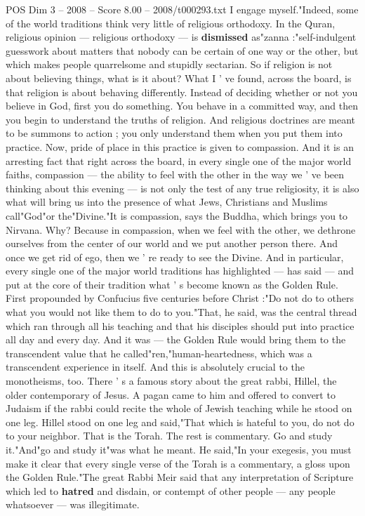 \begin{textsample}{POS Dim 3 – 2008 – Score 8.00 – 2008/t000293.txt}
I engage myself."Indeed, some of the world traditions think very little of religious orthodoxy.
In the Quran, religious opinion — religious orthodoxy — is \textbf{dismissed} as"zanna :"self-indulgent guesswork about matters that nobody can be certain of one way or the other, but which makes people quarrelsome and stupidly sectarian.
So if religion is not about believing things, what is it about?
What I ' ve found, across the board, is that religion is about behaving differently.
Instead of deciding whether or not you believe in God, first you do something.
You behave in a committed way, and then you begin to understand the truths of religion.
And religious doctrines are meant to be summons to action ; you only understand them when you put them into practice.
Now, pride of place in this practice is given to compassion.
And it is an arresting fact that right across the board, in every single one of the major world faiths, compassion — the ability to feel with the other in the way we ' ve been thinking about this evening — is not only the test of any true religiosity, it is also what will bring us into the presence of what Jews, Christians and Muslims call"God"or the"Divine."It is compassion, says the Buddha, which brings you to Nirvana.
Why?
Because in compassion, when we feel with the other, we dethrone ourselves from the center of our world and we put another person there.
And once we get rid of ego, then we ' re ready to see the Divine.
And in particular, every single one of the major world traditions has highlighted — has said — and put at the core of their tradition what ' s become known as the Golden Rule.
First propounded by Confucius five centuries before Christ :"Do not do to others what you would not like them to do to you."That, he said, was the central thread which ran through all his teaching and that his disciples should put into practice all day and every day.
And it was — the Golden Rule would bring them to the transcendent value that he called"ren,"human-heartedness, which was a transcendent experience in itself.
And this is absolutely crucial to the monotheisms, too.
There ' s a famous story about the great rabbi, Hillel, the older contemporary of Jesus.
A pagan came to him and offered to convert to Judaism if the rabbi could recite the whole of Jewish teaching while he stood on one leg.
Hillel stood on one leg and said,"That which is hateful to you, do not do to your neighbor.
That is the Torah.
The rest is commentary.
Go and study it."And"go and study it"was what he meant.
He said,"In your exegesis, you must make it clear that every single verse of the Torah is a commentary, a gloss upon the Golden Rule."The great Rabbi Meir said that any interpretation of Scripture which led to \textbf{hatred} and disdain, or contempt of other people — any people whatsoever — was illegitimate.

\end{textsample}
